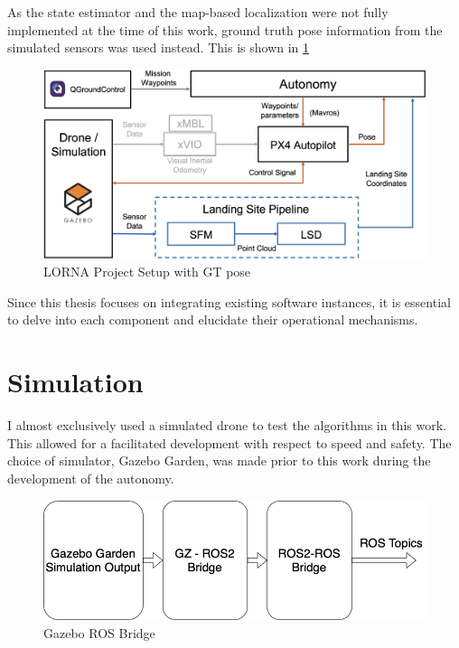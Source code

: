 As the state estimator and the map-based localization were not fully implemented at the time of this work, ground truth pose information from the simulated sensors was used instead. This is shown in \cref{fig:lorna_setup_GT_pose}

\begin{figure}[ht]
    \centering
    \includegraphics[scale=0.18]{images/system_overview/setup_flowchart.png}
    \caption{LORNA Project Setup with GT pose}
    \label{fig:lorna_setup_GT_pose}
\end{figure}

Since this thesis focuses on integrating existing software instances, it is essential to delve into each component and elucidate their operational mechanisms.

\clearpage %
\section{Simulation}\label{sec:simulation}

I almost exclusively used a simulated drone to test the algorithms in this work. This allowed for a facilitated development with respect to speed and safety. The choice of simulator, Gazebo Garden, was made prior to this work during the development of the autonomy.

\begin{figure}[ht!]
    \centering
    \includegraphics[scale=0.45]{images/system_overview/GZ_flowchart.png}
    \caption{Gazebo ROS Bridge}
\end{figure}


